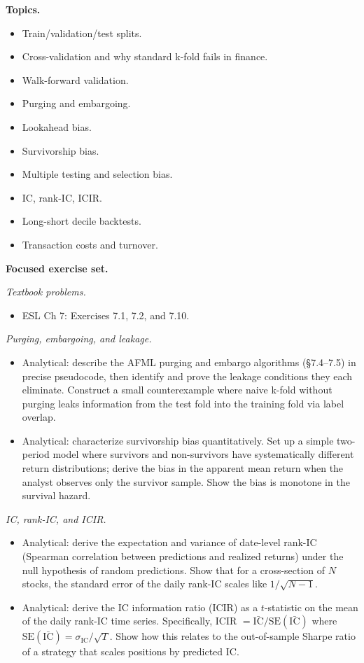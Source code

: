 \textbf{Topics.}

\begin{itemize}
\tightlist
\item
  Train/validation/test splits.
\item
  Cross-validation and why standard k-fold fails in finance.
\item
  Walk-forward validation.
\item
  Purging and embargoing.
\item
  Lookahead bias.
\item
  Survivorship bias.
\item
  Multiple testing and selection bias.
\item
  IC, rank-IC, ICIR.
\item
  Long-short decile backtests.
\item
  Transaction costs and turnover.
\end{itemize}

\textbf{Focused exercise set.}

\emph{Textbook problems.}

\begin{itemize}
\tightlist
\item
  ESL Ch 7: Exercises 7.1, 7.2, and 7.10.
\end{itemize}

\emph{Purging, embargoing, and leakage.}

\begin{itemize}
\tightlist
\item
  Analytical: describe the AFML purging and embargo algorithms
  (§7.4--7.5) in precise pseudocode, then identify and prove the leakage
  conditions they each eliminate. Construct a small counterexample where
  naive k-fold without purging leaks information from the test fold into
  the training fold via label overlap.
\item
  Analytical: characterize survivorship bias quantitatively. Set up a
  simple two-period model where survivors and non-survivors have
  systematically different return distributions; derive the bias in the
  apparent mean return when the analyst observes only the survivor
  sample. Show the bias is monotone in the survival hazard.
\end{itemize}

\emph{IC, rank-IC, and ICIR.}

\begin{itemize}
\tightlist
\item
  Analytical: derive the expectation and variance of date-level rank-IC
  (Spearman correlation between predictions and realized returns) under
  the null hypothesis of random predictions. Show that for a
  cross-section of \(N\) stocks, the standard error of the daily rank-IC
  scales like \(1/\sqrt{N-1}\).
\item
  Analytical: derive the IC information ratio (ICIR) as a
  \(t\)-statistic on the mean of the daily rank-IC time series.
  Specifically, ICIR \(= \bar{\text{IC}} / \text{SE}(\bar{\text{IC}})\)
  where \(\text{SE}(\bar{\text{IC}}) = \sigma_{\text{IC}}/\sqrt{T}\).
  Show how this relates to the out-of-sample Sharpe ratio of a strategy
  that scales positions by predicted IC.
\end{itemize}

